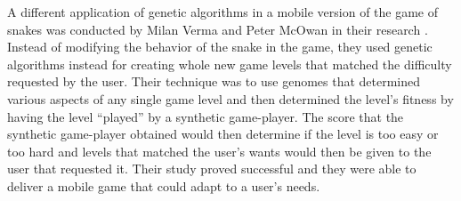 A different application of genetic algorithms in a mobile version of the game of snakes
was conducted by Milan Verma and Peter McOwan in their research \cite{Verma05}. Instead
of modifying the behavior of the snake in the game, they used genetic algorithms instead
for creating whole new game levels that matched the difficulty requested by the user.
Their technique was to use genomes that determined various aspects of any single game
level and then determined the level's fitness by having the level “played” by a synthetic
game-player. The score that the synthetic game-player obtained would then determine if
the level is too easy or too hard and levels that matched the user's wants would then be
given to the user that requested it. Their study proved successful and they were able to
deliver a mobile game that could adapt to a user's needs.